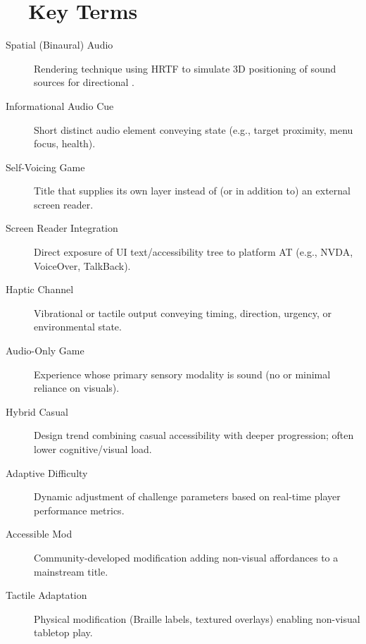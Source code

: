 \section{~~Key Terms}
\label{sec:gaming-key-terms}
\begin{description}
	\item[Spatial (Binaural) Audio]  Rendering technique using HRTF to simulate 3D positioning of sound sources for directional .
	\item[Informational Audio Cue]  Short distinct audio element conveying state (e.g., target proximity, menu focus, health).
	\item[Self-Voicing Game]  Title that supplies its own  layer instead of (or in addition to) an external screen reader.
	\item[Screen Reader Integration]  Direct exposure of UI text/accessibility tree to platform AT (e.g., NVDA, VoiceOver, TalkBack).
	\item[Haptic Channel]  Vibrational or tactile output conveying timing, direction, urgency, or environmental state.
	\item[Audio-Only Game]  Experience whose primary sensory modality is sound (no or minimal reliance on visuals).
	\item[Hybrid Casual]  Design trend combining casual accessibility with deeper progression; often lower cognitive/visual load.
	\item[Adaptive Difficulty]  Dynamic adjustment of challenge parameters based on real-time player performance metrics.
	\item[Accessible Mod]  Community-developed modification adding non-visual affordances to a mainstream title.
	\item[Tactile Adaptation]  Physical modification (Braille labels, textured overlays) enabling non-visual tabletop play.
\end{description}

